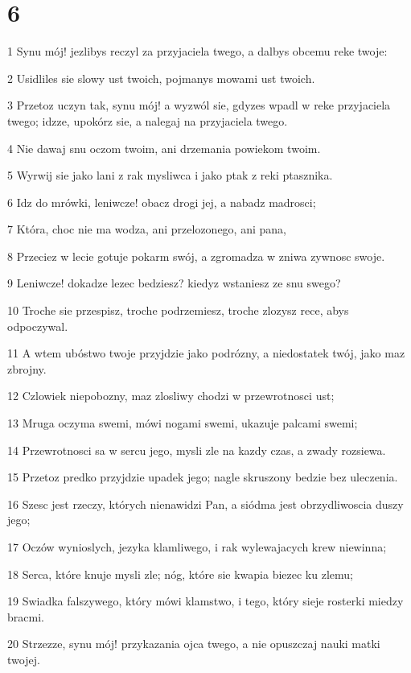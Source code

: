 \chapter{6}

\par 1 Synu mój! jezlibys reczyl za przyjaciela twego, a dalbys obcemu reke twoje:
\par 2 Usidliles sie slowy ust twoich, pojmanys mowami ust twoich.
\par 3 Przetoz uczyn tak, synu mój! a wyzwól sie, gdyzes wpadl w reke przyjaciela twego; idzze, upokórz sie, a nalegaj na przyjaciela twego.
\par 4 Nie dawaj snu oczom twoim, ani drzemania powiekom twoim.
\par 5 Wyrwij sie jako lani z rak mysliwca i jako ptak z reki ptasznika.
\par 6 Idz do mrówki, leniwcze! obacz drogi jej, a nabadz madrosci;
\par 7 Która, choc nie ma wodza, ani przelozonego, ani pana,
\par 8 Przeciez w lecie gotuje pokarm swój, a zgromadza w zniwa zywnosc swoje.
\par 9 Leniwcze! dokadze lezec bedziesz? kiedyz wstaniesz ze snu swego?
\par 10 Troche sie przespisz, troche podrzemiesz, troche zlozysz rece, abys odpoczywal.
\par 11 A wtem ubóstwo twoje przyjdzie jako podrózny, a niedostatek twój, jako maz zbrojny.
\par 12 Czlowiek niepobozny, maz zlosliwy chodzi w przewrotnosci ust;
\par 13 Mruga oczyma swemi, mówi nogami swemi, ukazuje palcami swemi;
\par 14 Przewrotnosci sa w sercu jego, mysli zle na kazdy czas, a zwady rozsiewa.
\par 15 Przetoz predko przyjdzie upadek jego; nagle skruszony bedzie bez uleczenia.
\par 16 Szesc jest rzeczy, których nienawidzi Pan, a siódma jest obrzydliwoscia duszy jego;
\par 17 Oczów wynioslych, jezyka klamliwego, i rak wylewajacych krew niewinna;
\par 18 Serca, które knuje mysli zle; nóg, które sie kwapia biezec ku zlemu;
\par 19 Swiadka falszywego, który mówi klamstwo, i tego, który sieje rosterki miedzy bracmi.
\par 20 Strzezze, synu mój! przykazania ojca twego, a nie opuszczaj nauki matki twojej.
